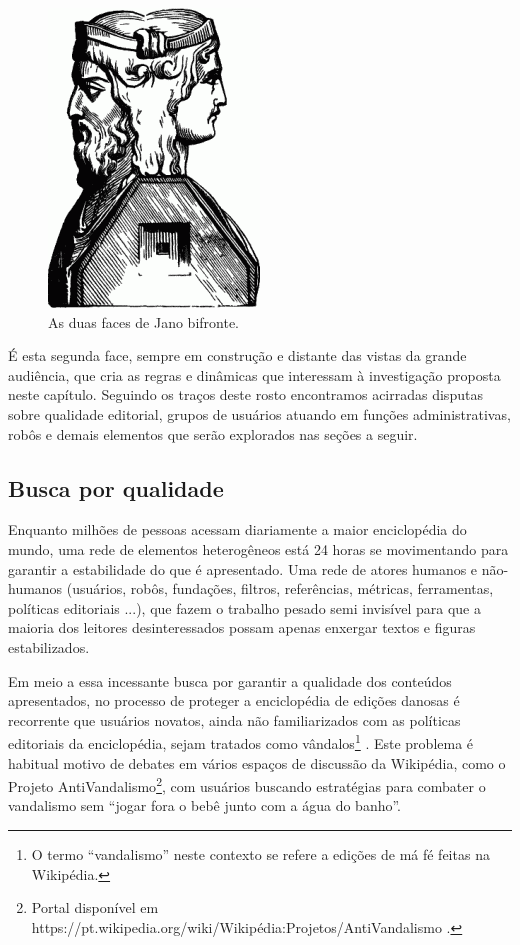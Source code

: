 \begin{figure}[H]
    \centering
    \includegraphics[width=0.5\textwidth]{Images/duas_faces_jano.png}
    \caption{As duas faces de Jano bifronte.}
    \label{fig:duas_faces_jano}
\end{figure}

É esta segunda face, sempre em construção e distante das vistas da grande audiência, que cria as regras e dinâmicas que interessam à investigação proposta neste capítulo. Seguindo os traços deste rosto encontramos acirradas disputas sobre qualidade editorial, grupos de usuários atuando em funções administrativas, robôs e demais elementos que serão explorados nas seções a seguir.

\subsection{Busca por qualidade}

Enquanto milhões de pessoas acessam diariamente a maior enciclopédia do mundo, uma rede de elementos heterogêneos está 24 horas se movimentando para garantir a estabilidade do que é apresentado. Uma rede de atores humanos e não-humanos (usuários, robôs, fundações, filtros, referências, métricas, ferramentas, políticas editoriais ...), que fazem o trabalho pesado semi invisível para que a maioria dos leitores desinteressados possam apenas enxergar textos e figuras estabilizados.

Em meio a essa incessante busca por garantir a qualidade dos conteúdos apresentados, no processo de proteger a enciclopédia de edições danosas é recorrente que usuários novatos, ainda não familiarizados com as políticas editoriais da enciclopédia, sejam tratados como vândalos\footnote{O termo ``vandalismo'' neste contexto se refere a edições de má fé feitas na Wikipédia.} \citep{halfaker_snuggle:_2014}. Este problema é habitual motivo de debates em vários espaços de discussão da Wikipédia, como o Projeto AntiVandalismo\footnote{Portal disponível em https://pt.wikipedia.org/wiki/Wikipédia:Projetos/AntiVandalismo .}, com usuários buscando estratégias para combater o vandalismo sem ``jogar fora o bebê junto com a água do banho''.

